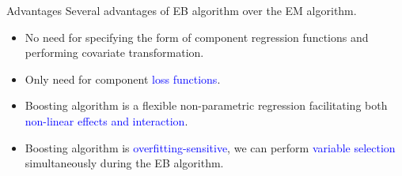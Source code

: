 \documentclass[11pt]{article}
\numberwithin{equation}{section}
\newcommand{\blue}[1]{\textcolor{blue}{#1}}
\begin{document}
\begin{frame}{Advantages}
	Several advantages of EB algorithm over the EM algorithm.
	\begin{itemize}
		\item No need for specifying the form of component regression functions and performing covariate transformation.
		\item Only need for component \blue{loss functions}.
		\item Boosting algorithm is a flexible non-parametric regression facilitating both \blue{non-linear effects and interaction}.
		\item  Boosting algorithm is \blue{overfitting-sensitive}, we can perform \blue{variable selection} simultaneously during the EB algorithm.
	\end{itemize}
\end{frame}



\end{document}
